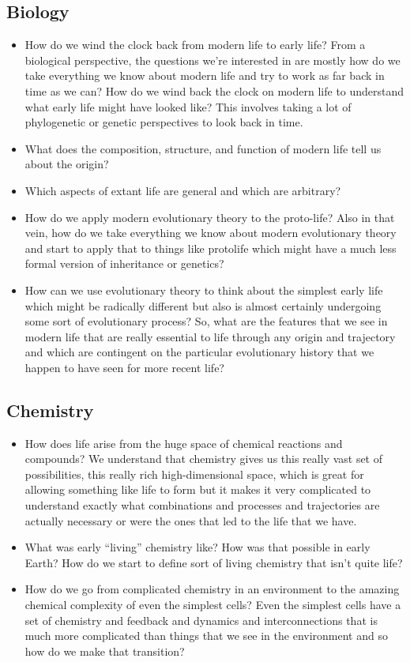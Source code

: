 \documentclass[]{article}
\begin{document}
\subsection{Biology}
\begin{itemize}
	\item How do we wind the clock back from modern life to early life? From a biological perspective, the questions we're interested in are mostly how do we take everything we know about modern life and try to work as far back in time as we can? How do we wind back the clock on modern life to understand what early life might have looked like?
	This involves taking a lot of phylogenetic or genetic perspectives to
	look back in time.
	\item  What does the composition, structure, and function of modern life tell us about the origin?
	\item  Which aspects of extant life are general and which are arbitrary?
	\item How do we apply modern evolutionary theory to the proto-life? Also in that vein, how do we take everything we know about modern evolutionary theory and start to apply that to things like protolife which might have a much less formal version of inheritance or genetics?
	\item How can we use evolutionary theory to think about the simplest early life which
	might be radically different but also is almost certainly undergoing some sort of
	evolutionary process? So, what are the features that we see in 	modern life that are really essential to life through any origin and trajectory and which are contingent on the particular evolutionary history that we happen to have seen for more recent life?
\end{itemize}	


\subsection{Chemistry}
\begin{itemize}
	\item How does life arise from the huge space of chemical reactions and compounds? 
	We understand that chemistry gives us 	this really vast set of possibilities, 	this really rich high-dimensional space, which is great for allowing something 	like life to form but it makes it very complicated to understand exactly what combinations and processes and trajectories are actually necessary or were the ones that led to the life that we have.
	\item What was early “living” chemistry like? How was that possible in early Earth? How do 	we start to define sort of living chemistry that isn't quite life?
	\item How do we go from complicated chemistry in an environment to the amazing chemical complexity of even the simplest cells? Even the simplest cells have a set of chemistry and feedback and dynamics and interconnections that is much more 
	complicated than things that we see in the environment and so how do we make that
	transition?
\end{itemize}
\end{document}
